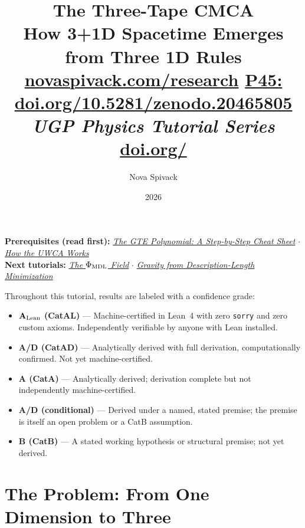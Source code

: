 \documentclass[11pt,a4paper]{article}
\title{\textbf{The Three-Tape CMCA}\\[6pt]
\large How 3+1D Spacetime Emerges from Three 1D Rules\\[8pt]
\normalsize
\href{https://novaspivack.com/research}{novaspivack.com/research}\quad
\href{https://doi.org/10.5281/zenodo.20465805}{P45:
  doi.org/10.5281/zenodo.20465805}\\[4pt]\normalsize\textit{UGP Physics Tutorial Series}
\\[2pt]\small\href{https://doi.org/\TutorialDOI}{doi.org/\TutorialDOI}}
\author{Nova Spivack}
\date{2026}
\begin{document}
\setcounter{tocdepth}{2}
\maketitle
\tableofcontents
\newpage

\begin{tcolorbox}[colback=blue!6,colframe=blue!40!black,
  title=\textbf{UGP Physics Tutorial Series}]
\textbf{Prerequisites (read first):} \href{https://doi.org/10.5281/zenodo.20657889}{\emph{The GTE Polynomial: A Step-by-Step Cheat Sheet}} $\cdot$ \href{https://doi.org/10.5281/zenodo.20657919}{\emph{How the UWCA Works}}\\[4pt]
\textbf{Next tutorials:} \href{https://doi.org/10.5281/zenodo.20657885}{\emph{The $\Phi_{\rm MDL}$ Field}} $\cdot$ \href{https://doi.org/10.5281/zenodo.20657870}{\emph{Gravity from Description-Length Minimization}}\\[4pt]
\end{tcolorbox}

\begin{tcolorbox}[colback=boxgreen,colframe=green!50!black,
  title=\textbf{Claim-Strength Taxonomy}]
Throughout this tutorial, results are labeled with a confidence grade:
\begin{itemize}[itemsep=2pt]
  \item \textbf{$\mathbf{A}_{\rm Lean}$ (CatAL)} --- Machine-certified in Lean~4 with zero \texttt{sorry} and zero custom axioms.  Independently verifiable by anyone with Lean installed.
  \item \textbf{A/D (CatAD)} --- Analytically derived with full derivation, computationally confirmed.  Not yet machine-certified.
  \item \textbf{A (CatA)} --- Analytically derived; derivation complete but not independently machine-certified.
  \item \textbf{A/D (conditional)} --- Derived under a named, stated premise; the premise is itself an open problem or a CatB assumption.
  \item \textbf{B (CatB)} --- A stated working hypothesis or structural premise; not yet derived.
\end{itemize}
\end{tcolorbox}


\section{The Problem: From One Dimension to Three}
\label{sec:problem}
\end{document}
